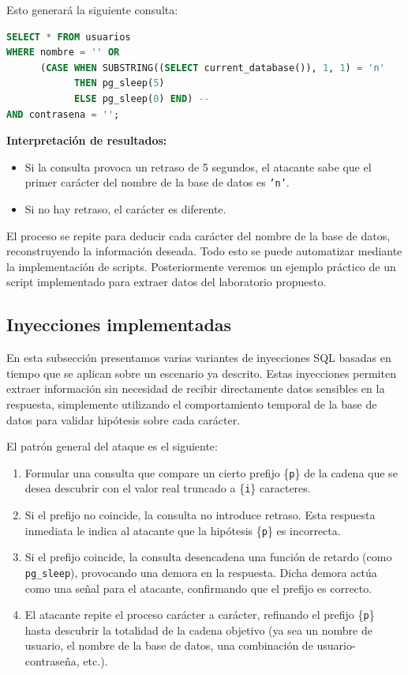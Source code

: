 \documentclass[a4paper,12pt]{article}
\begin{document}
Esto generará la siguiente consulta:

\begin{lstlisting}[language=SQL]
SELECT * FROM usuarios 
WHERE nombre = '' OR 
      (CASE WHEN SUBSTRING((SELECT current_database()), 1, 1) = 'n' 
            THEN pg_sleep(5) 
            ELSE pg_sleep(0) END) -- 
AND contrasena = '';
\end{lstlisting}

\textbf{Interpretación de resultados:}
\begin{itemize}
    \item Si la consulta provoca un retraso de 5 segundos, el atacante sabe que el primer carácter del nombre de la base de datos es \texttt{'n'}.
    \item Si no hay retraso, el carácter es diferente.
\end{itemize}

El proceso se repite para deducir cada carácter del nombre de la base de datos, reconstruyendo la información deseada.
Todo esto se puede automatizar mediante la implementación de scripts. Posteriormente veremos un ejemplo práctico de un script implementado para extraer datos
del laboratorio propuesto.

\subsection{Inyecciones implementadas}

En esta subsección presentamos varias variantes de inyecciones SQL basadas en tiempo que se aplican sobre un escenario ya descrito. Estas inyecciones permiten extraer información sin necesidad de recibir directamente datos sensibles en la respuesta, simplemente utilizando el comportamiento temporal de la base de datos para validar hipótesis sobre cada carácter.

El patrón general del ataque es el siguiente:
\begin{enumerate}
    \item Formular una consulta que compare un cierto prefijo \{\texttt{p}\} de la cadena que se desea descubrir con el valor real truncado a \{\texttt{i}\} caracteres.
    \item Si el prefijo no coincide, la consulta no introduce retraso. Esta respuesta inmediata le indica al atacante que la hipótesis \{\texttt{p}\} es incorrecta.
    \item Si el prefijo coincide, la consulta desencadena una función de retardo (como \texttt{pg\_sleep}), provocando una demora en la respuesta. Dicha demora actúa como una señal para el atacante, confirmando que el prefijo es correcto.
    \item El atacante repite el proceso carácter a carácter, refinando el prefijo \{\texttt{p}\} hasta descubrir la totalidad de la cadena objetivo (ya sea un nombre de usuario, el nombre de la base de datos, una combinación de usuario-contraseña, etc.).
\end{enumerate}
\end{document}
